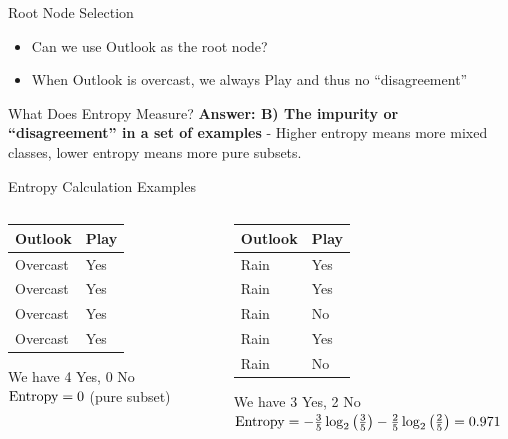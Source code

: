 \documentclass[usenames,dvipsnames]{beamer}
\begin{document}
\begin{frame}{Root Node Selection}
\begin{itemize}
\item Can we use Outlook as the root node?
				\pause 	\item When Outlook is overcast, we always Play and thus no ``disagreement'' 
\end{itemize}
\end{frame}
	
\begin{frame}{What Does Entropy Measure?}
\textbf{Answer: B) The impurity or ``disagreement'' in a set of examples} - Higher entropy means more mixed classes, lower entropy means more pure subsets.
\end{frame}

\begin{frame}{Entropy Calculation Examples}
\begin{columns}
\begin{column}{.32\textwidth}
	\begin{table}

\begin{tabular}{l|l} \toprule
	\textbf{Outlook} & \textbf{Play} \\ \midrule

	Overcast & Yes  \\
	Overcast & Yes  \\
	Overcast & Yes  \\
	Overcast & Yes  \\ \bottomrule

\end{tabular}
We have 4 Yes, 0 No
$\operatorname{Entropy} = 0$ (pure subset)

	\end{table}

\end{column}

\pause \begin{column}{.32\textwidth}
	\begin{table}
\begin{tabular}{l|l} \toprule
	\textbf{Outlook} & \textbf{Play} \\ \midrule
	Rain     & Yes  \\
	Rain     & Yes  \\
	Rain     & No   \\
	Rain     & Yes  \\
	Rain     & No  \\ \bottomrule
\end{tabular}
We have 3 Yes, 2 No
$\operatorname{Entropy} = -\frac{3}{5} \log_2\left(\frac{3}{5}\right) - \frac{2}{5} \log_2\left(\frac{2}{5}\right) = 0.971$
\end{table}
\end{column}
\end{columns}
\end{frame}
\end{document}
